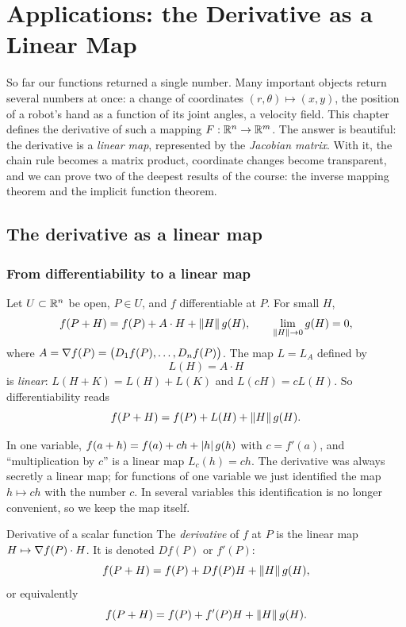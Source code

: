 \clearpage
{}\renewcommand{\tabname}{V}
\chapter{Applications: the Derivative as a Linear Map}\label{ch:linear}

So far our functions returned a single number. Many important objects return several
numbers at once: a change of coordinates $(r,\theta)\mapsto(x,y)$, the position of a robot's
hand as a function of its joint angles, a velocity field. This chapter defines the derivative
of such a mapping $F:\mathbb{R}^n\to\mathbb{R}^m$. The answer is beautiful: the derivative is a
\emph{linear map}, represented by the \emph{Jacobian matrix}. With it, the chain rule becomes a
matrix product, coordinate changes become transparent, and we can prove two of the deepest
results of the course: the inverse mapping theorem and the implicit function theorem.

\section{The derivative as a linear map}

\subsection{From differentiability to a linear map}

Let $U\subset\mathbb{R}^n$ be open, $P\in U$, and $f$ differentiable at $P$. For small $H$,
\[ f(P+H)=f(P)+A\cdot H+\left\lVert H\right\rVert g(H),\qquad \lim_{\left\lVert H\right\rVert\to0}g(H)=0, \]
where $A=\nabla f(P)=\big(D_1f(P),\dots,D_nf(P)\big)$. The map $L=L_A$ defined by
\[ L(H)=A\cdot H \]
is \emph{linear}: $L(H+K)=L(H)+L(K)$ and $L(cH)=cL(H)$. So differentiability reads
\[ f(P+H)=f(P)+L(H)+\left\lVert H\right\rVert g(H). \]

\begin{intuition}
In one variable, $f(a+h)=f(a)+ch+\left\lvert h\right\rvert g(h)$ with $c=f'(a)$, and ``multiplication by $c$'' is a
linear map $L_c(h)=ch$. The derivative was always secretly a linear map; for functions of one
variable we just identified the map $h\mapsto ch$ with the number $c$. In several variables this
identification is no longer convenient, so we keep the map itself.
\end{intuition}

\begin{definition}{Derivative of a scalar function}
The \emph{derivative} of $f$ at $P$ is the linear map $H\mapsto\nabla f(P)\cdot H$. It is
denoted $Df(P)$ or $f'(P)$:
\[ f(P+H)=f(P)+Df(P)H+\left\lVert H\right\rVert g(H), \]
or equivalently
\[ f(P+H)=f(P)+f'(P)H+\left\lVert H\right\rVert g(H). \]
\end{definition}

